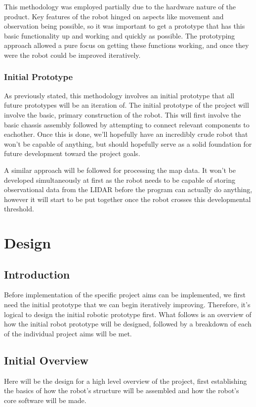 	This methodology was employed partially due to the hardware nature of the product. Key features of the robot hinged on aspects like movement and observation being possible, so it was important to get a prototype that has this basic functionality up and working and quickly as possible. The prototyping approach allowed a pure focus on getting these functions working, and once they were the robot could be improved iteratively.
	
		\subsection{Initial Prototype}
		As previously stated, this methodology involves an initial prototype that all future prototypes will be an iteration of. The initial prototype of the project will involve the basic, primary construction of the robot. This will first involve the basic chassis assembly followed by attempting to connect relevant components to eachother. Once this is done, we'll hopefully have an incredibly crude robot that won't be capable of anything, but should hopefully serve as a solid foundation for future development toward the project goals.
		
		A similar approach will be followed for processing the map data. It won't be developed simultaneously at first as the robot needs to be capable of storing observational data from the LIDAR before the program can actually do anything, however it will start to be put together once the robot crosses this developmental threshold.
	
	\chapter{Design}
		\section{Introduction}
		Before implementation of the specific project aims can be implemented, we first need the initial prototype that we can begin iteratively improving. Therefore, it's logical to design the initial robotic prototype first. What follows is an overview of how the initial robot prototype will be designed, followed by a breakdown of each of the individual project aims will be met.
	
		\section{Initial Overview}
		Here will be the design for a high level overview of the project, first establishing the basics of how the robot's structure will be assembled and how the robot's core software will be made.
		
